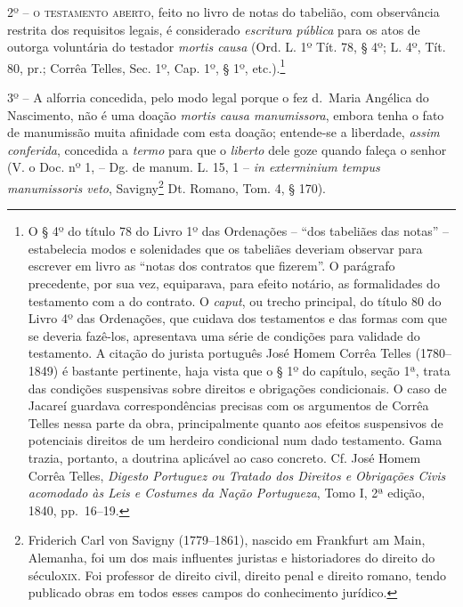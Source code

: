 2º -- \textsc{o testamento aberto}, feito no livro de notas do tabelião, com
observância restrita dos requisitos legais, é considerado
\emph{escritura pública} para os atos de outorga voluntária do testador
\emph{mortis causa} (Ord. L. 1º Tít. 78, § 4º; L. 4º, Tít. 80, pr.;
Corrêa Telles, Sec. 1º, Cap. 1º, § 1º, etc.).\footnote{ O § 4º do
  título 78 do Livro 1º das Ordenações -- ``dos tabeliães das notas'' --
  estabelecia modos e solenidades que os tabeliães deveriam observar
  para escrever em livro as ``notas dos contratos que fizerem''. O
  parágrafo precedente, por sua vez, equiparava, para efeito notário, as
  formalidades do testamento com a do contrato. O \emph{caput}, ou
  trecho principal, do título 80 do Livro 4º das Ordenações, que cuidava
  dos testamentos e das formas com que se deveria fazê-los, apresentava
  uma série de condições para validade do testamento. A citação do
  jurista português José Homem Corrêa Telles (1780--1849) é bastante
  pertinente, haja vista que o § 1º do capítulo, seção 1ª, trata das
  condições suspensivas sobre direitos e obrigações condicionais. O caso
  de Jacareí guardava correspondências precisas com os argumentos de
  Corrêa Telles nessa parte da obra, principalmente quanto aos efeitos
  suspensivos de potenciais direitos de um herdeiro condicional num dado
  testamento. Gama trazia, portanto, a doutrina aplicável ao caso
  concreto. Cf. José Homem Corrêa Telles, \emph{Digesto Portuguez ou
  Tratado dos Direitos e Obrigações Civis acomodado às Leis e Costumes
  da Nação Portugueza}, Tomo I, 2ª edição, 1840, pp.~16--19.}

3º -- A alforria concedida, pelo modo legal porque o fez d.~Maria
Angélica do Nascimento, não é uma doação \emph{mortis causa
manumissora}, embora tenha o fato de manumissão muita afinidade com esta
doação; entende-se a liberdade, \emph{assim conferida}, concedida a
\emph{termo} para que o \emph{liberto} dele goze quando faleça o senhor
(V. o Doc. nº 1, -- Dg. de manum. L. 15, 1 -- \emph{in exterminium
tempus manumissoris veto}, Savigny\footnote{ Friderich Carl von Savigny
  (1779--1861), nascido em Frankfurt am Main, Alemanha, foi um dos mais
  influentes juristas e historiadores do direito do século\textsc{xix}. Foi
  professor de direito civil, direito penal e direito romano, tendo
  publicado obras em todos esses campos do conhecimento jurídico.} Dt.
Romano, Tom. 4, § 170).

